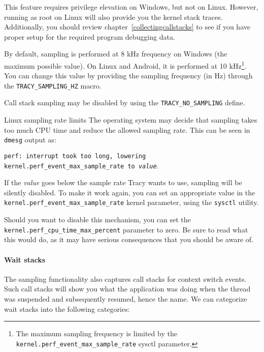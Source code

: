 \documentclass[hidelinks,titlepage,a4paper,twoside]{article}
\begin{document}
This feature requires privilege elevation on Windows, but not on Linux. However, running as root on Linux will also provide you the kernel stack traces. Additionally, you should review chapter~\ref{collectingcallstacks} to see if you have proper setup for the required program debugging data.

By default, sampling is performed at 8 kHz frequency on Windows (the maximum possible value). On Linux and Android, it is performed at 10 kHz\footnote{The maximum sampling frequency is limited by the \texttt{kernel.perf\_event\_max\_sample\_rate} sysctl parameter.}. You can change this value by providing the sampling frequency (in Hz) through the \texttt{TRACY\_SAMPLING\_HZ} macro.

Call stack sampling may be disabled by using the \texttt{TRACY\_NO\_SAMPLING} define.

\begin{bclogo}[
noborder=true,
couleur=black!5,
logo=\bcbombe
]{Linux sampling rate limits}
The operating system may decide that sampling takes too much CPU time and reduce the allowed sampling rate. This can be seen in \texttt{dmesg} output as:

\texttt{perf: interrupt took too long, lowering kernel.perf\_event\_max\_sample\_rate to \emph{value}}.

If the \emph{value} goes below the sample rate Tracy wants to use, sampling will be silently disabled. To make it work again, you can set an appropriate value in the \texttt{kernel.perf\_event\_max\_sample\_rate} kernel parameter, using the \texttt{sysctl} utility.

Should you want to disable this mechanism, you can set the \texttt{kernel.perf\_cpu\_time\_max\_percent} parameter to zero. Be sure to read what this would do, as it may have serious consequences that you should be aware of.
\end{bclogo}

\paragraph{Wait stacks}
\label{waitstacks}

The sampling functionality also captures call stacks for context switch events. Such call stacks will show you what the application was doing when the thread was suspended and subsequently resumed, hence the name. We can categorize wait stacks into the following categories:
\end{document}
